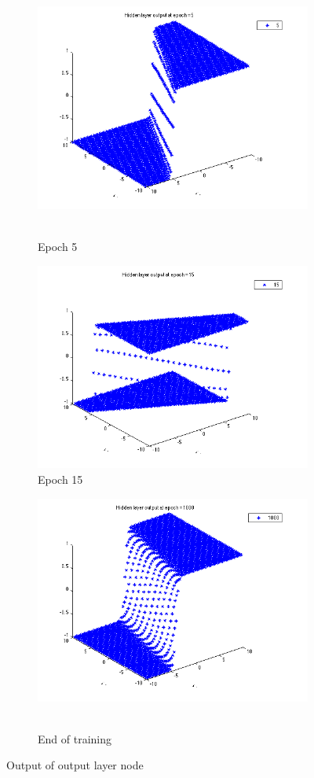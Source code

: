 \begin{figure}
  \begin{subfigure}{.5\textwidth}
  \centering
  \includegraphics[width=.8\linewidth]{Regression/bivariate/hidden_2layer_5.png}\
  \caption{Epoch 5}
\end{subfigure}%
\begin{subfigure}{.5\textwidth}
  \centering
  \includegraphics[width=.8\linewidth]{Regression/bivariate/hidden_2layer_15.png}
   \caption{Epoch 15}
  \end{subfigure}
  
  \begin{subfigure}{.5\textwidth}
  \centering
  \includegraphics[width=.8\linewidth]{Regression/bivariate/hidden_2layer_1000.png}\
  \caption{End of training}
\end{subfigure}%
  
\caption{Output of output layer node}
\end{figure}


